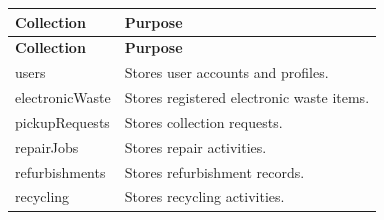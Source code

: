 \begin{longtable}{|p{5cm}|p{8cm}|}

\hline

\textbf{Collection}

&

\textbf{Purpose}

\\

\hline

\endfirsthead

\hline

\textbf{Collection}

&

\textbf{Purpose}

\\

\hline

\endhead

users

&

Stores user accounts and profiles.

\\

\hline

electronicWaste

&

Stores registered electronic waste items.

\\

\hline

pickupRequests

&

Stores collection requests.

\\

\hline

repairJobs

&

Stores repair activities.

\\

\hline

refurbishments

&

Stores refurbishment records.

\\

\hline

recycling

&

Stores recycling activities.

\\


\end{longtable}
